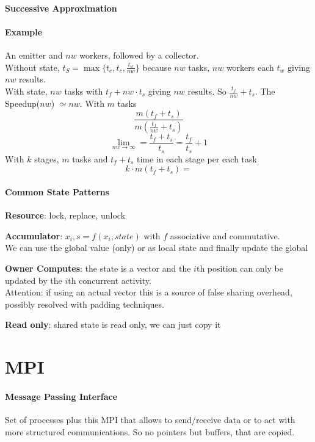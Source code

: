 \documentclass[10pt]{report}
\begin{document}
\paragraph{Successive Approximation} %
\paragraph{Example} An emitter and $nw$ workers, followed by a collector.\\
Without state, $t_S=\max\{t_e, t_c, \frac{t_w}{nw}\}$ because $nw$ tasks, $nw$ workers each $t_w$ giving $nw$ results.\\
With state, $nw$ tasks with $t_f+nw\cdot t_s$ giving $nw$ results. So $\frac{t_f}{nw}+t_s$. The Speedup($nw$) $\simeq nw$. With $m$ tasks
$$\frac{m(t_f + t_s)}{m(\frac{t_f}{nw}+t_s)}$$
$$\lim_{nw\to\infty} = \frac{t_f + t_s}{t_s} = \frac{t_f}{t_s} + 1$$
With $k$ stages, $m$ tasks and $t_f+t_s$ time in each stage per each task
$$k\cdot m(t_f+t_s) = $$
\paragraph{Common State Patterns}\begin{list}{}{}
	\item \textbf{Resource}: lock, replace, unlock
	\item \textbf{Accumulator}: $x_i, s= f(x_i, state)$ with $f$ associative and commutative.\\
	We can use the global value (only) or as local state and finally update the global
	\item \textbf{Owner Computes}: the state is a vector and the $i$th position can only be updated by the $i$th concurrent activity.\\
	Attention: if using an actual vector this is a source of false sharing overhead, possibly resolved with padding techniques.
	\item \textbf{Read only}: shared state is read only, we can just copy it
\end{list}
\section{MPI} \paragraph{Message Passing Interface} Set of processes plus this MPI that allows to send/receive data or to act with more structured communications. So no pointers but buffers, that are copied.
\end{document}
